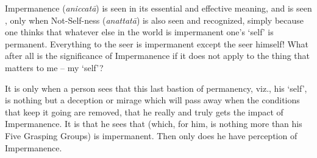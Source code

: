 Impermanence (\emph{aniccatā}) is seen in its essential and effective meaning, and is seen , only when Not-Self-ness (\emph{anattatā}) is also seen and recognized, simply because one thinks that whatever else in the world is impermanent one's `self' is permanent. Everything to the seer is impermanent except the seer himself! What after all is the significance of Impermanence if it does not apply to the  thing that matters to me -- my `self'?

It is only when a person sees that this last bastion of permanency, viz., his `self', is nothing but a deception or mirage which will pass away when the conditions that keep it going are removed, that he really and truly gets the impact of Impermanence. It is  that he sees that  (which, for him, is nothing more than his Five Grasping Groups) is impermanent. Then only does he have perception of Impermanence.
